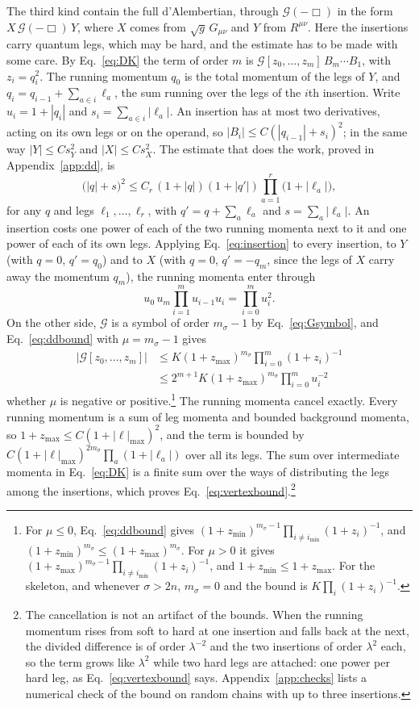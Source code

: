 \documentclass[a4paper,11pt]{article}
\begin{document}
The third kind contain the full d'Alembertian, through $\mathcal G(-\Box)$ in the form $X\,\mathcal G(-\Box)\,Y$, where $X$ comes from $\sqrt g\,G_{\mu\nu}$ and $Y$ from $R^{\mu\nu}$. Here the insertions carry quantum legs, which may be hard, and the estimate has to be made with some care. By Eq.~\eqref{eq:DK} the term of order $m$ is $\mathcal G[z_0,\dots,z_m]\,B_m\cdots B_1$, with $z_i=q_i^2$. The running momentum $q_0$ is the total momentum of the legs of $Y$, and $q_i=q_{i-1}+\sum_{a\in i}\ell_a$, the sum running over the legs of the $i$th insertion. Write $u_i=1+|q_i|$ and $s_i=\sum_{a\in i}|\ell_a|$. An insertion has at most two derivatives, acting on its own legs or on the operand, so $|B_i|\le C(|q_{i-1}|+s_i)^2$; in the same way $|Y|\le Cs_Y^2$ and $|X|\le Cs_X^2$. The estimate that does the work, proved in Appendix~\ref{app:dd}, is
\begin{equation}
\label{eq:insertion}
\bigl(|q|+s\bigr)^2\le C_r\,(1+|q|)(1+|q'|)\prod_{a=1}^r\bigl(1+|\ell_a|\bigr),
\end{equation}
for any $q$ and legs $\ell_1,\dots,\ell_r$, with $q'=q+\sum_a\ell_a$ and $s=\sum_a|\ell_a|$. An insertion costs one power of each of the two running momenta next to it and one power of each of its own legs. Applying Eq.~\eqref{eq:insertion} to every insertion, to $Y$ (with $q=0$, $q'=q_0$) and to $X$ (with $q=0$, $q'=-q_m$, since the legs of $X$ carry away the momentum $q_m$), the running momenta enter through
\[
u_0\,u_m\prod_{i=1}^mu_{i-1}u_i=\prod_{i=0}^mu_i^2 .
\]
On the other side, $\mathcal G$ is a symbol of order $m_\sigma-1$ by Eq.~\eqref{eq:Gsymbol}, and Eq.~\eqref{eq:ddbound} with $\mu=m_\sigma-1$ gives
\begin{align*}
|\mathcal G[z_0,\dots,z_m]|&\le K(1+z_{\max})^{m_\sigma}\prod_{i=0}^m(1+z_i)^{-1}\\
&\le2^{m+1}K(1+z_{\max})^{m_\sigma}\prod_{i=0}^mu_i^{-2}
\end{align*}
whether $\mu$ is negative or positive.\footnote{For $\mu\le0$, Eq.~\eqref{eq:ddbound} gives $(1+z_{\min})^{m_\sigma-1}\prod_{i\ne i_{\min}}(1+z_i)^{-1}$, and $(1+z_{\min})^{m_\sigma}\le(1+z_{\max})^{m_\sigma}$. For $\mu>0$ it gives $(1+z_{\max})^{m_\sigma-1}\prod_{i\ne i_{\min}}(1+z_i)^{-1}$, and $1+z_{\min}\le1+z_{\max}$. For the skeleton, and whenever $\sigma>2n$, $m_\sigma=0$ and the bound is $K\prod_i(1+z_i)^{-1}$.} The running momenta cancel exactly. Every running momentum is a sum of leg momenta and bounded background momenta, so $1+z_{\max}\le C(1+|\ell|_{\max})^2$, and the term is bounded by $C(1+|\ell|_{\max})^{2m_\sigma}\prod_a(1+|\ell_a|)$ over all its legs. The sum over intermediate momenta in Eq.~\eqref{eq:DK} is a finite sum over the ways of distributing the legs among the insertions, which proves Eq.~\eqref{eq:vertexbound}.\footnote{The cancellation is not an artifact of the bounds. When the running momentum rises from soft to hard at one insertion and falls back at the next, the divided difference is of order $\lambda^{-2}$ and the two insertions of order $\lambda^2$ each, so the term grows like $\lambda^2$ while two hard legs are attached: one power per hard leg, as Eq.~\eqref{eq:vertexbound} says. Appendix~\ref{app:checks} lists a numerical check of the bound on random chains with up to three insertions.}
\end{document}
